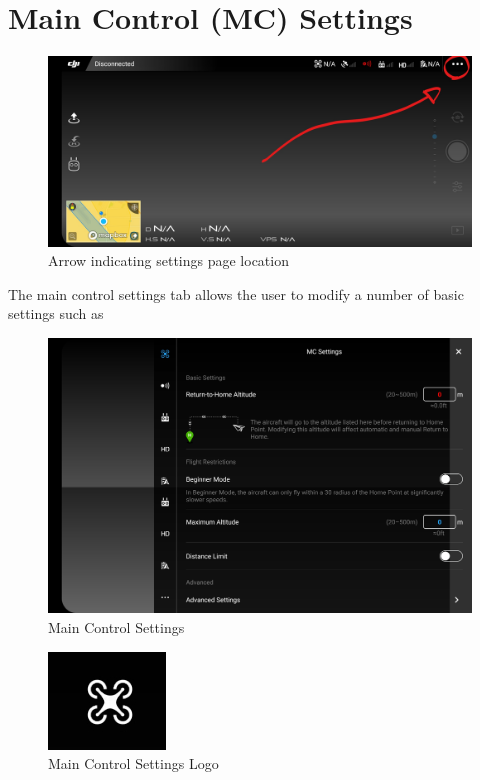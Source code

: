 \documentclass[
]{book}
\begin{document}
\hypertarget{main-control-mc-settings}{%
\section{Main Control (MC) Settings}\label{main-control-mc-settings}}

\begin{figure}
\centering
\includegraphics{images/DJI-SettingsPage.jpg}
\caption{Arrow indicating settings page location}
\end{figure}

The main control settings tab allows the user to modify a number of basic settings such as

\begin{figure}
\centering
\includegraphics{images/MC/DJI-MC-SettingsPage.jpg}
\caption{Main Control Settings}
\end{figure}

\begin{figure}
\centering
\includegraphics{images/MC/DJI-MClogo.jpg}
\caption{Main Control Settings Logo}
\end{figure}
\end{document}
